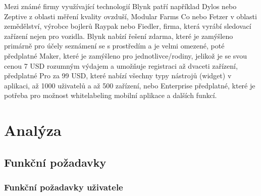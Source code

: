 Mezi známé firmy využívající technologií Blynk patří například Dylos nebo Zeptive z oblasti měření kvality ovzduší, Modular Farms Co nebo Fetzer v oblasti zemědělství, výrobce bojlerů Raypak nebo Fiedler, firma, která vyrábí sledovací zařízení nejen pro vozidla.
Blynk nabízí řešení zdarma, které je zamýšleno primárně pro účely seznámení se s prostředím a je velmi omezené, poté předplatné Maker, které je zamýšleno pro jednotlivce/rodiny, jelikož je se svou cenou 7 USD rozumným výdajem a umožňuje registraci až dvaceti zařízení, předplatné Pro za 99 USD, které nabízí všechny typy nástrojů (widget) v aplikaci, až 1000 uživatelů a až 500 zařízení, nebo Enterprise předplatné, které je potřeba pro možnost whitelabeling mobilní aplikace a dalších funkcí.

\chapter{Analýza}

\section{Funkční požadavky}

\subsection{Funkční požadavky uživatele}

